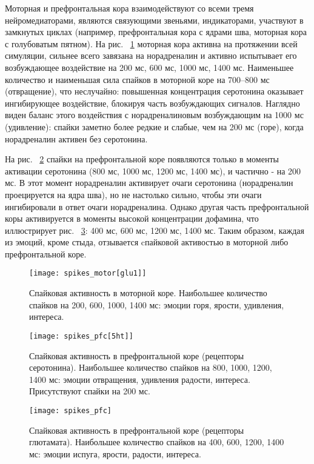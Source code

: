 Моторная и префронтальная кора взаимодействуют со всеми тремя нейромедиаторами, являются связующими звеньями, индикаторами, участвуют в замкнутых циклах (например, префронтальная кора с ядрами шва, моторная кора с голубоватым пятном). На рис. ~\ref{fig:spikes_motor} моторная кора активна на протяжении всей симуляции, сильнее всего завязана на норадреналин и активно испытывает его возбуждающее воздействие на 200 мс, 600 мс, 1000 мс, 1400 мс. Наименьшее количество и наименьшая сила спайков в моторной коре на 700--800 мс (отвращение), что неслучайно: повышенная концентрация серотонина оказывает ингибирующее воздействие, блокируя часть возбуждающих сигналов. Наглядно виден баланс этого воздействия с норадреналиновым возбуждающим на 1000 мс (удивление): спайки заметно более редкие и слабые, чем на 200 мс (горе), когда норадреналин активен без серотонина.


На рис. ~\ref{fig:spikes_pfc[5ht]} спайки на префронтальной коре появляются только в моменты активации серотонина (800 мс, 1000 мс, 1200 мс, 1400 мс), и частично - на 200 мс. В этот момент норадреналин активирует очаги серотонина (норадреналин проецируется на ядра шва), но не настолько сильно, чтобы эти очаги ингибировали в ответ очаги норадреналина. Однако другая часть префронтальной коры активируется в моменты высокой концентрации дофамина, что иллюстрирует рис.  ~\ref{fig:spikes_pfc}: 400 мс, 600 мс, 1200 мс, 1400 мс. Таким образом, каждая из эмоций, кроме стыда, отзывается cпайковой активостью в моторной либо префронтальной коре.


\begin{figure}
	\centering
	\texttt{[image: spikes\_motor[glu1]]}
	\caption{Спайковая активность в моторной коре. Наибольшее количество спайков на 200, 600, 1000, 1400 мс: эмоции горя, ярости, удивления, интереса.}
	\label{fig:spikes_motor}
\end{figure}

\begin{figure}
	\centering
	\texttt{[image: spikes\_pfc[5ht]]}
	\caption{Спайковая активность в префронтальной коре (рецепторы серотонина).  Наибольшее количество спайков на 800, 1000, 1200, 1400 мс: эмоции отвращения, удивления радости, интереса. Присутствуют спайки на 200 мс.}
	\label{fig:spikes_pfc[5ht]}
\end{figure}


\begin{figure}
	\centering
	\texttt{[image: spikes\_pfc]}
	\caption{Спайковая активность в префронтальной коре (рецепторы глютамата).  Наибольшее количество спайков на 400, 600, 1200, 1400 мс: эмоции испуга, ярости, радости, интереса.}
	\label{fig:spikes_pfc}
\end{figure}



